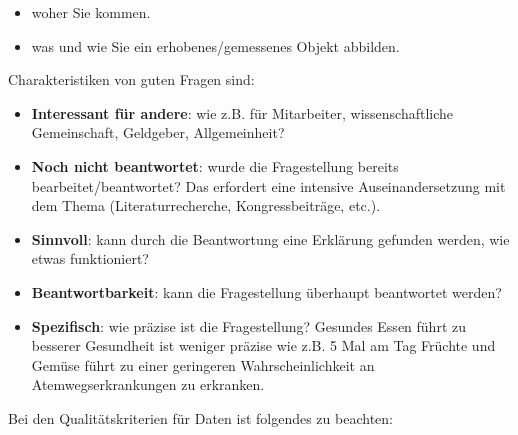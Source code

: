 \documentclass[]{article}
\providecommand{\tightlist}{%
  \setlength{\itemsep}{0pt}\setlength{\parskip}{0pt}}
\begin{document}
\begin{itemize}
\tightlist
\item
  woher Sie kommen.
\item
  was und wie Sie ein erhobenes/gemessenes Objekt abbilden.
\end{itemize}

Charakteristiken von guten Fragen sind:

\begin{itemize}
\tightlist
\item
  \textbf{Interessant für andere}: wie z.B. für Mitarbeiter,
  wissenschaftliche Gemeinschaft, Geldgeber, Allgemeinheit?
\item
  \textbf{Noch nicht beantwortet}: wurde die Fragestellung bereits
  bearbeitet/beantwortet? Das erfordert eine intensive
  Auseinandersetzung mit dem Thema (Literaturrecherche,
  Kongressbeiträge, etc.).
\item
  \textbf{Sinnvoll}: kann durch die Beantwortung eine Erklärung gefunden
  werden, wie etwas funktioniert?
\item
  \textbf{Beantwortbarkeit}: kann die Fragestellung überhaupt
  beantwortet werden?
\item
  \textbf{Spezifisch}: wie präzise ist die Fragestellung? Gesundes Essen
  führt zu besserer Gesundheit ist weniger präzise wie z.B. 5 Mal am Tag
  Früchte und Gemüse führt zu einer geringeren Wahrscheinlichkeit an
  Atemwegserkrankungen zu erkranken.
\end{itemize}

Bei den Qualitätskriterien für Daten ist folgendes zu beachten:
\end{document}

